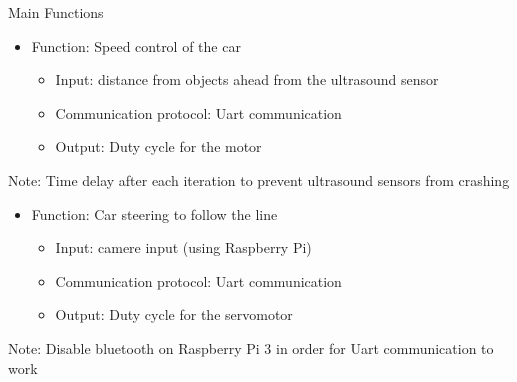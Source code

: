 \begin{frame}[plain]{Main Functions}
\pause
\begin{itemize}
\item Function: Speed control of the car	
\pause
	\begin{itemize}
	\item<1-> Input: distance from objects ahead from the ultrasound sensor
	\pause
	\item<2-> Communication protocol: Uart communication
	\pause
	\item<3-> Output: Duty cycle for the motor
	\end{itemize}
\end{itemize}
\pause

Note: Time delay after each iteration to prevent ultrasound sensors from crashing

\vspace{1cm}
	
\pause
\begin{itemize}
\item Function: Car steering to follow the line	
\pause
	\begin{itemize}
	\item<1-> Input: camere input (using Raspberry Pi)
	\pause
	\item<2-> Communication protocol: Uart communication
	\pause
	\item<3-> Output: Duty cycle for the servomotor 
	\end{itemize}
\end{itemize}
\pause
Note: Disable bluetooth on Raspberry Pi 3 in order for Uart communication to work
	
	
\end{frame}


